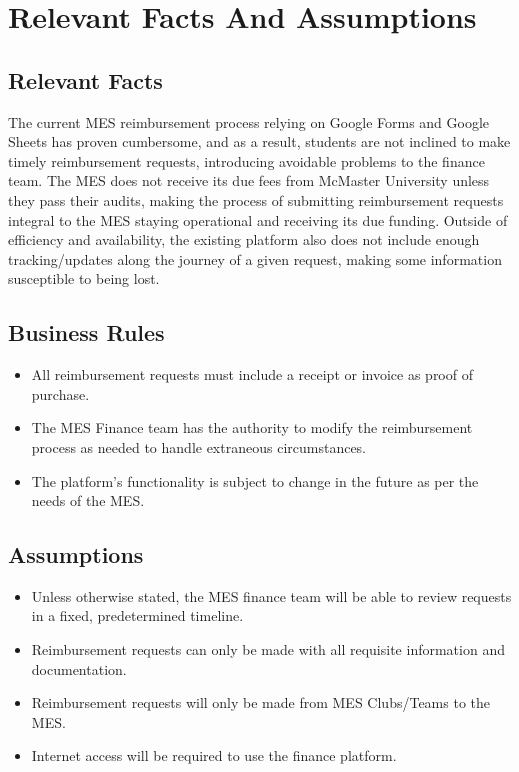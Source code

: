 \documentclass[12pt]{article}
\begin{document}
\section{Relevant Facts And Assumptions}
\subsection{Relevant Facts}
The current MES reimbursement process relying on Google Forms and Google Sheets has proven cumbersome, and as a result, students are not inclined to make timely reimbursement requests, introducing avoidable problems to the finance team.
The MES does not receive its due fees from McMaster University unless they pass their audits, making the process of submitting reimbursement requests integral to the MES staying operational and receiving its due funding.
Outside of efficiency and availability, the existing platform also does not include enough tracking/updates along the journey of a given request, making some information susceptible to being lost.

\subsection{Business Rules}
\begin{itemize}
    \item All reimbursement requests must include a receipt or invoice as proof of purchase.
    \item The MES Finance team has the authority to modify the reimbursement process as needed to handle extraneous circumstances.
    \item The platform’s functionality is subject to change in the future as per the needs of the MES.
\end{itemize}

\subsection{Assumptions}
\begin{itemize}
    \item Unless otherwise stated, the MES finance team will be able to review requests in a fixed, predetermined timeline.
    \item Reimbursement requests can only be made with all requisite information and documentation.
    \item Reimbursement requests will only be made from MES Clubs/Teams to the MES.
    \item Internet access will be required to use the finance platform.
\end{itemize}
\end{document}

